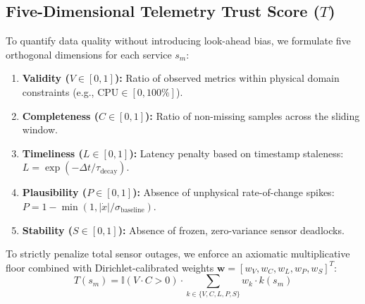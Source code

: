 \documentclass[conference]{IEEEtran}
\begin{document}
\subsection{Five-Dimensional Telemetry Trust Score (\texorpdfstring{$T$}{T})}
To quantify data quality without introducing look-ahead bias, we formulate five orthogonal dimensions for each service $s_m$:
\begin{enumerate}
    \item \textbf{Validity ($V \in [0, 1]$):} Ratio of observed metrics within physical domain constraints (e.g., $\text{CPU} \in [0, 100\%]$).
    \item \textbf{Completeness ($C \in [0, 1]$):} Ratio of non-missing samples across the sliding window.
    \item \textbf{Timeliness ($L \in [0, 1]$):} Latency penalty based on timestamp staleness: $L = \exp(-\Delta t / \tau_{\text{decay}})$.
    \item \textbf{Plausibility ($P \in [0, 1]$):} Absence of unphysical rate-of-change spikes: $P = 1 - \min(1, |\dot{x}| / \sigma_{\text{baseline}})$.
    \item \textbf{Stability ($S \in [0, 1]$):} Absence of frozen, zero-variance sensor deadlocks.
\end{enumerate}

To strictly penalize total sensor outages, we enforce an axiomatic multiplicative floor combined with Dirichlet-calibrated weights $\mathbf{w} = [w_V, w_C, w_L, w_P, w_S]^T$:
\begin{equation}
T(s_m) = \mathbb{I}(V \cdot C > 0) \cdot \sum_{k \in \{V,C,L,P,S\}} w_k \cdot k(s_m)
\end{equation}
\end{document}
